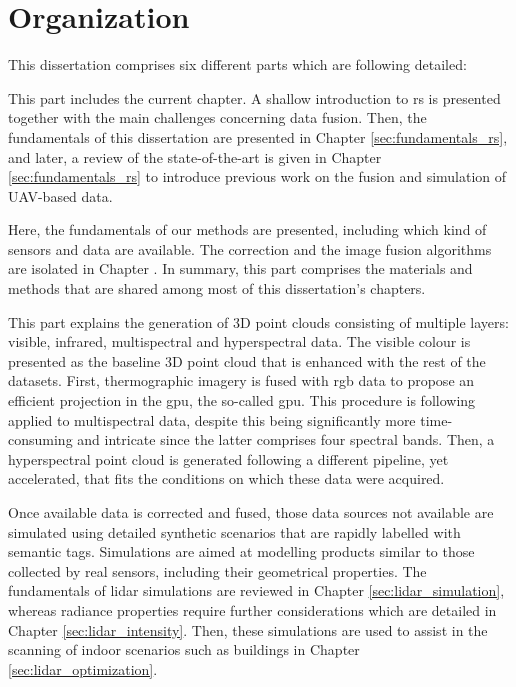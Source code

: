 \section{Organization}

This dissertation comprises six different parts which are following detailed:

\newcommand{\partTabSize}{3mm}

\small \noindent \textbf{} \normalsize\hspace{\partTabSize} This part includes the current chapter. A shallow introduction to \acrshort{rs} is presented together with the main challenges concerning data fusion. Then, the fundamentals of this dissertation are presented in Chapter \ref{sec:fundamentals_rs}, and later, a review of the state-of-the-art is given in Chapter \ref{sec:fundamentals_rs} to introduce previous work on the fusion and simulation of UAV-based data.

\small \noindent \textbf{} \normalsize\hspace{\partTabSize} Here, the fundamentals of our methods are presented, including which kind of sensors and data are available. The correction and the image fusion algorithms are isolated in Chapter . In summary, this part comprises the materials and methods that are shared among most of this dissertation's chapters.

\small \noindent \textbf{} \normalsize\hspace{\partTabSize} This part explains the generation of 3D point clouds consisting of multiple layers: visible, infrared, multispectral and hyperspectral data. The visible colour is presented as the baseline 3D point cloud that is enhanced with the rest of the datasets. First, thermographic imagery is fused with \acrshort{rgb} data to propose an efficient projection in the \acrshort{gpu}, the so-called \acrshort{gpu}. This procedure is following applied to multispectral data, despite this being significantly more time-consuming and intricate since the latter comprises four spectral bands. Then, a hyperspectral point cloud is generated following a different pipeline, yet accelerated, that fits the conditions on which these data were acquired.  

\small \noindent \textbf{} \normalsize\hspace{\partTabSize} Once available data is corrected and fused, those data sources not available are simulated using detailed synthetic scenarios that are rapidly labelled with semantic tags. Simulations are aimed at modelling products similar to those collected by real sensors, including their geometrical properties. The fundamentals of \acrshort{lidar} simulations are reviewed in Chapter \ref{sec:lidar_simulation}, whereas radiance properties require further considerations which are detailed in Chapter \ref{sec:lidar_intensity}. Then, these simulations are used to assist in the scanning of indoor scenarios such as buildings in Chapter \ref{sec:lidar_optimization}.

